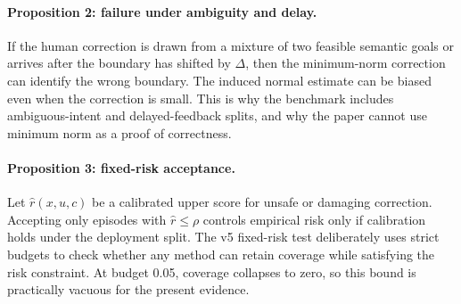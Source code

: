 \documentclass{article}
\begin{document}
\paragraph{Proposition 2: failure under ambiguity and delay.}
If the human correction is drawn from a mixture of two feasible semantic goals or arrives after the boundary has shifted by $\Delta$, then the minimum-norm correction can identify the wrong boundary. The induced normal estimate can be biased even when the correction is small. This is why the benchmark includes ambiguous-intent and delayed-feedback splits, and why the paper cannot use minimum norm as a proof of correctness.
\paragraph{Proposition 3: fixed-risk acceptance.}
Let $\hat r(x,u,c)$ be a calibrated upper score for unsafe or damaging correction. Accepting only episodes with $\hat r\leq\rho$ controls empirical risk only if calibration holds under the deployment split. The v5 fixed-risk test deliberately uses strict budgets to check whether any method can retain coverage while satisfying the risk constraint. At budget 0.05, coverage collapses to zero, so this bound is practically vacuous for the present evidence.
\end{document}
